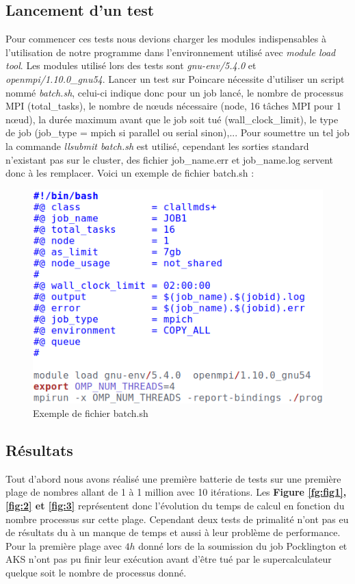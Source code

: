 		\subsection{Lancement d'un test}
Pour commencer ces tests nous devions charger les modules indispensables à l'utilisation de notre programme dans l’environnement utilisé avec  \textit{module load tool}. Les modules utilisé lors des tests sont \textit{gnu-env/5.4.0} et \textit{openmpi/1.10.0\_gnu54}. Lancer un test sur Poincare nécessite d'utiliser un script nommé \textit{batch.sh}, celui-ci indique donc pour un job lancé, le nombre de processus MPI (total\_tasks), le nombre de nœuds nécessaire (node, 16 tâches MPI pour 1 nœud), la durée maximum avant que le job soit tué (wall\_clock\_limit), le type de job (job\_type = mpich si parallel ou serial sinon),... Pour soumettre un tel job la commande \textit{llsubmit batch.sh} est utilisé, cependant les sorties standard n'existant pas sur le cluster, des fichier job\_name.err et job\_name.log servent donc à les remplacer. Voici un exemple de fichier batch.sh :\\
	 \begin{figure}[!ht]	
		\begin{center}\includegraphics[scale=0.6]{batch.png}\end{center}
		\caption{Exemple de fichier batch.sh}
		\label{fg:bat}
\end{figure}
		\subsection{Résultats}
	
Tout d'abord nous avons réalisé une première batterie de tests sur une première plage de nombres allant de 1 à 1 million avec 10 itérations. Les \textbf{Figure \ref{fg:fig1}, \ref{fig:2} et \ref{fig:3}} représentent donc l'évolution du temps de calcul en fonction du nombre processus sur cette plage. Cependant deux tests de primalité n'ont pas eu de résultats du à un manque de temps et aussi à leur problème de performance. Pour la première plage avec $4h$ donné lors de la soumission du job  Pocklington et AKS n'ont pas pu finir leur exécution avant d'être tué par le supercalculateur quelque soit le nombre de processus donné. 
		
